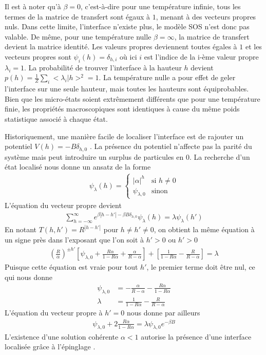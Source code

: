 Il est à noter qu'à $\beta=0$, c'est-à-dire pour une température infinie, tous les termes de la matrice de transfert sont égaux à $1$, menant à des vecteurs propres nuls. Dans cette limite, l'interface n'existe plus, le modèle SOS n'est donc pas valable. De même, pour une température nulle $\beta=\infty$, la matrice de transfert devient la matrice identité. Les valeurs propres deviennent toutes égales à $1$ et les vecteurs propres sont $\psi_i(h) = \delta_{h,i}$ où ici $i$ est l'indice de la i-ème valeur propre $\lambda_i = 1$. La probabilité de trouver l'interface à la hauteur $h$ devient $p(h) = \frac{1}{Z}\sum_{i} <\lambda_i | h >^2 = 1$. La température nulle a pour effet de geler l'interface sur une seule hauteur, mais toutes les hauteurs sont équiprobables. Bien que les micro-états soient extrêmement différents que pour une température finie, les propriétés macroscopiques sont identiques à cause du même poids statistique associé à chaque état.


Historiquement, une manière facile de localiser l'interface est de rajouter un potentiel $V(h) = -B \delta_{h,0}$ \cite{chui_pinning_1999,chalker_pinning_1981,chalker_pinning_1982}. La présence du potentiel n'affecte pas la parité du système mais peut introduire un surplus de particules en $0$. La recherche d'un état localisé nous donne un ansatz de la forme 
\begin{align}
	\psi_\lambda(h) = \begin{cases} |\alpha|^h & \text{si } h \neq 0 \\ \psi_{\lambda,0} & \text{sinon} \end{cases} 
\end{align}
L'équation du vecteur propre devient
\begin{align}
	\sum_{h=-\infty}^\infty e^{\beta |h-h'|- \beta B \delta_{h,0}} \psi_\lambda(h) = \lambda \psi_\lambda(h')
\end{align}
En notant $T(h,h') = R^{|h-h'|}$ pour $h \neq h' \neq 0$,  on obtient la même équation à un signe près dans l'exposant que l'on soit à $h'>0$ ou $h'>0$
\begin{align}
	\left( \frac{R}{\alpha} \right)^{\pm h'} \left[ \psi_{\lambda,0} + \frac{R \alpha}{1 - R \alpha} + \frac{\alpha}{R - \alpha} \right] + \left[ \frac{1}{1-R \alpha} - \frac{R}{R-\alpha} \right] = \lambda
\end{align}
Puisque cette équation est vraie pour tout $h'$, le premier terme doit être nul, ce qui nous donne
\begin{align}
	\psi_{\lambda,0} &= - \frac{\alpha}{R-\alpha}-\frac{R \alpha}{1-R \alpha} \\
	\lambda &= \frac{1}{1-R \alpha} - \frac{R}{R-\alpha}
\end{align}
L'équation du vecteur propre à $h'=0$ nous donne par ailleurs 
\begin{align}
	\psi_{\lambda,0} + 2 \frac{R \alpha}{1-R \alpha} = \lambda \psi_{\lambda,0} e^{-\beta B}
\end{align}
L'existence d'une solution cohérente $\alpha \less 1$ autorise la présence d'une interface localisée grâce à l'épinglage \cite{burkhardt_localisation-delocalisation_1981,kroll_solid--solid_1981,kroll_pinning_1982,kroll_interface_1983}.

